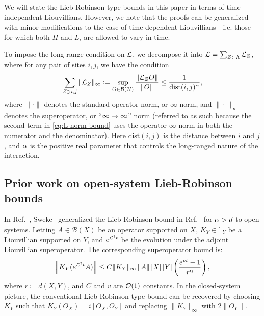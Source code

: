 We will state the Lieb-Robinson-type bounds in this paper in terms of time-independent Liouvillians. However, we note that the proofs can be generalized with minor modifications to the case of time-dependent Liouvillians---i.e. those for which both $H$ and $L_i$ are allowed to vary in time.

To impose the long-range condition on $\mathcal{L}$, we decompose it into $\mathcal{L} = \sum_{Z\subset \Lambda} \mathcal{L}_Z$, where for any pair of sites $i,j$, we have the condition
\begin{align}
  \label{eq:L-norm-bound}
    \sum_{Z\ni i,j}\|\mathcal{L}_{Z}\|_{\infty} \coloneqq \sup_{O\in\mathcal{B(H)}} \frac{\|\mathcal{L}_{Z}O\|}{\|O\|}\le \frac{1}{\text{dist}(i,j)^{\alpha}},
\end{align}
where $\|\cdot\|$ denotes the standard operator norm, or $\infty$-norm, and  $\|\cdot\|_{\infty}$ denotes the superoperator, or ``$\infty \rightarrow \infty$'' norm (referred to as such because the second term in \cref{eq:L-norm-bound} uses the operator $\infty$-norm in both the numerator and the denominator).
Here $\text{dist}(i,j)$ is the distance between $i$ and $j$, and $\alpha$ is the positive real parameter that controls the long-ranged nature of the interaction.

\subsection{Prior work on open-system Lieb-Robinson bounds}
In Ref.~\cite{Sweke2019}, Sweke \etal~generalized the Lieb-Robinson bound in Ref.~\cite{Hastings2006} for $\alpha > d$ to open systems.
Letting $A\in \mathcal B(X)$ be an operator supported on $X$, $K_Y\in \mathbb{L}_Y$ be a Liouvillian supported on $Y$, and $e^{\mathcal{L}^\dag t}$ be the evolution under the adjoint Liouvillian superoperator.
The corresponding superoperator bound is:
\begin{align}
  \left\|  K_Y(e^{\mathcal{L}^\dag t}A)\right\| \leq C \|K_Y\|_{\infty} \left\|A\right\|  \left | X \right|\left | Y \right|
    \left(
    \frac{e^{vt}-1}{r^{\alpha}}
    \right)
    ,\label{eq:LR-HK-open}
\end{align}
where $r\coloneqq d(X,Y)$, and $C$ and $v$ are $\O1$ constants.
In the closed-system picture, the conventional Lieb-Robinson-type bound can be recovered by choosing $K_Y$ such that $K_Y (O_X) = i[O_X,O_Y]$ and replacing $\|K_Y\|_{\infty}$ with $2\|O_Y\|$.

